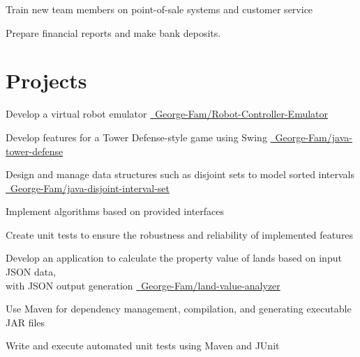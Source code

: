 \documentclass[letterpaper,10pt]{article}
\begin{document}
  \begin{resume_list}
    \item Train new team members on point-of-sale systems and customer service
    \item Prepare financial reports and make bank deposits.
  \end{resume_list}


  \section{Projects}

  \begin{resume_list}
    \item Develop a virtual robot emulator {\small \href{https://github.com/George-Fam/Robot-Controller-Emulator}{\faGithubSquare\ George-Fam/Robot-Controller-Emulator}}
    \vspace{2pt}
    \item Develop features for a Tower Defense-style game using Swing {\small \href{https://github.com/George-Fam/java-tower-defense}{\faGithubSquare\ George-Fam/java-tower-defense}}
    \vspace{2pt}
    \item Design and manage data structures such as disjoint sets to model sorted intervals {\small \href{https://github.com/George-Fam/java-disjoint-interval-set}{\faGithubSquare\ George-Fam/java-disjoint-interval-set}}
    \vspace{2pt}
    \item Implement algorithms based on provided interfaces
    \vspace{2pt}
    \item Create unit tests to ensure the robustness and reliability of implemented features
  \end{resume_list}

  \begin{resume_list}
    \item Develop an application to calculate the property value of lands based on input JSON data,\\ with JSON output generation {\small \href{https://github.com/George-Fam/land-value-analyzer}{\faGithubSquare\ George-Fam/land-value-analyzer}}
    \vspace{2pt}
    \item Use Maven for dependency management, compilation, and generating executable JAR files
    \vspace{2pt}
    \item Write and execute automated unit tests using Maven and JUnit
  \end{resume_list}
  
\end{document}

